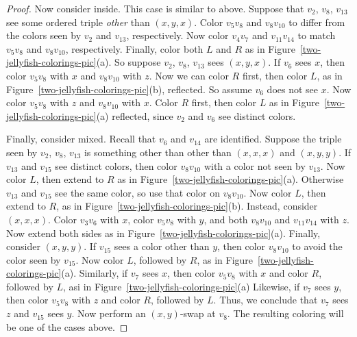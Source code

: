 \documentclass[12pt]{article}
\theoremstyle{plain}
\theoremstyle{definition}
\theoremstyle{remark}
\begin{document}
\begin{proof}
Now consider inside.
This case is similar to above.  
Suppose that $v_2$, $v_8$, $v_{13}$ see some ordered triple \emph{other} than $(x,y,x)$.
Color $v_5v_8$ and $v_8v_{10}$ to differ from the colors seen by $v_2$ and
$v_{13}$, respectively.  Now color $v_4v_7$ and $v_{11}v_{14}$ to match
$v_5v_8$ and $v_8v_{10}$, respectively.  Finally, color both $L$ and $R$ as in
Figure~\ref{two-jellyfish-colorings-pic}(a).  So suppose $v_2$, $v_8$, $v_{13}$
sees $(x,y,x)$.
If $v_6$ sees $x$, then color
$v_5v_8$ with $x$ and $v_8v_{10}$ with $z$.  Now we can color $R$ first,
then color $L$, as in Figure~\ref{two-jellyfish-colorings-pic}(b), reflected. 
So assume $v_6$ does not see $x$.  Now color $v_5v_8$ with $z$ and $v_8v_{10}$ with
$x$. Color $R$ first, then color $L$ as in
Figure~\ref{two-jellyfish-colorings-pic}(a) reflected, since $v_2$ and $v_6$ see distinct
colors.

Finally, consider mixed.  Recall that $v_6$ and $v_{14}$ are identified.
Suppose the triple seen by $v_2$, $v_8$, $v_{13}$ is something other than
other than $(x,x,x)$ and $(x,y,y)$.  If $v_{13}$ and
$v_{15}$ see distinct colors, then color $v_8v_{10}$ with a color not seen by
$v_{13}$.  Now color $L$, then extend to $R$ as in
Figure~\ref{two-jellyfish-colorings-pic}(a).  Otherwise $v_{13}$ and $v_{15}$
see the same color, so use that color on $v_8v_{10}$.  Now color $L$, then
extend to $R$,  as in Figure~\ref{two-jellyfish-colorings-pic}(b).
Instead, consider $(x,x,x)$.  Color $v_3v_6$ with $x$,
color $v_5v_8$ with $y$, and both $v_8v_{10}$ and $v_{11}v_{14}$ with $z$.  Now
extend both sides as in Figure~\ref{two-jellyfish-colorings-pic}(a).  
Finally, consider $(x,y,y)$.  If $v_{15}$ sees a color other than $y$, then
color $v_8v_{10}$ to avoid the color seen by $v_{15}$.  Now color $L$,
followed by $R$, as in Figure~\ref{two-jellyfish-colorings-pic}(a).
Similarly, if $v_7$ sees $x$, then color $v_5v_8$ with
$x$ and color $R$, followed by $L$, asi in
Figure~\ref{two-jellyfish-colorings-pic}(a)  Likewise, if $v_7$ sees $y$,
then color $v_5v_8$ with $z$ and color $R$, followed by $L$.
Thus, we conclude that $v_7$ sees $z$ and $v_{15}$ sees $y$.  Now perform an
$(x,y)$-swap at $v_8$.  The resulting coloring will be one of the cases above.
\end{proof}


\end{document}
